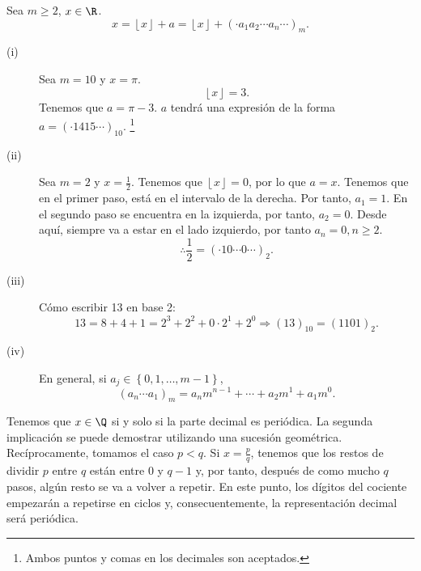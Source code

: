 \begin{notation}
\normalfont Sea $\displaystyle m \geq 2 $, $\displaystyle x \in \R $.
\[x = \left\lfloor x \right\rfloor + a = \left\lfloor x \right\rfloor + \left( \cdot a_{1}a_{2} \cdots a_{n} \cdots \right)_{m} .\]
\end{notation}

\begin{eg}
\normalfont 
\begin{description}
\item[(i)] Sea $\displaystyle m = 10 $ y $\displaystyle x = \pi  $. 
\[\left\lfloor x \right\rfloor = 3 .\]
Tenemos que $\displaystyle a = \pi - 3 $. $\displaystyle a $ tendrá una expresión de la forma $\displaystyle a = \left( \cdot 1415 \cdots\right)_{10} $. \footnote{Ambos puntos y comas en los decimales son aceptados.}  
\item[(ii)] Sea $\displaystyle m = 2 $ y $\displaystyle x = \frac{1}{2} $. Tenemos que $\displaystyle \left\lfloor x \right\rfloor = 0 $, por lo que $\displaystyle a = x $. Tenemos que en el primer paso, está en el intervalo de la derecha. Por tanto, $\displaystyle a_{1} = 1 $. En el segundo paso se encuentra en la izquierda, por tanto, $\displaystyle a_{2} = 0 $. Desde aquí, siempre va a estar en el lado izquierdo, por tanto $\displaystyle a_{n} = 0, n \geq 2 $. 
	\[\therefore \frac{1}{2} = \left( \cdot 10 \cdots 0 \cdots \right)_{2} .\]
\item[(iii)] Cómo escribir 13 en base 2:
	\[13 = 8 + 4 + 1 = 2^{3} + 2^{2} + 0 \cdot 2^{1}+ 2^{0} \Rightarrow (13)_{10} = \left(1101\right)_{2} .\]
\item[(iv)] En general, si $\displaystyle a_{j}\in \left\{ 0, 1, \ldots, m - 1 \right\}  $, 
	\[\left(a_{n} \cdots a_{1}\right)_{m} = a_{n}m^{n-1} + \cdots + a_{2}m^{1}+a_{1}m^{0} .\]
\end{description}
\end{eg}

\begin{observation}
\normalfont Tenemos que $\displaystyle x \in \Q $ si y solo si la parte decimal es periódica. La segunda implicación se puede demostrar utilizando una sucesión geométrica. Recíprocamente, tomamos el caso $\displaystyle p < q $. Si $\displaystyle x = \frac{p}{q} $, tenemos que los restos de dividir $\displaystyle p $ entre $\displaystyle q $ están entre 0 y $\displaystyle q -1 $ y, por tanto, después de como mucho $\displaystyle q $ pasos, algún resto se va a volver a repetir. En este punto, los dígitos del cociente empezarán a repetirse en ciclos y, consecuentemente, la representación decimal será periódica.
\end{observation}

